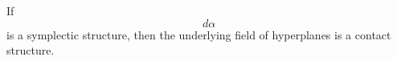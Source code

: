 If $$d\alpha$$ is a symplectic structure, then the underlying field of hyperplanes is a contact structure.
